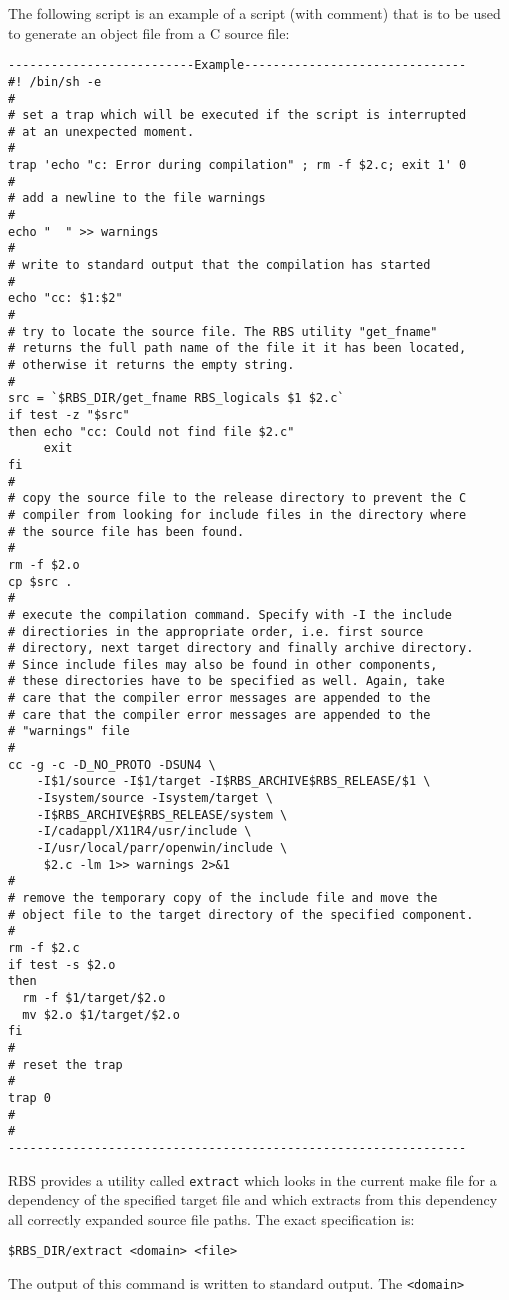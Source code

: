 The following script is an example of a script (with comment) that is to be 
used to generate an object file from a C source file:
\begin{verbatim}
--------------------------Example-------------------------------
#! /bin/sh -e
#
# set a trap which will be executed if the script is interrupted 
# at an unexpected moment.
#
trap 'echo "c: Error during compilation" ; rm -f $2.c; exit 1' 0
#
# add a newline to the file warnings
#
echo "  " >> warnings
#
# write to standard output that the compilation has started
#
echo "cc: $1:$2"
#
# try to locate the source file. The RBS utility "get_fname" 
# returns the full path name of the file it it has been located,
# otherwise it returns the empty string.
#
src = `$RBS_DIR/get_fname RBS_logicals $1 $2.c`
if test -z "$src"
then echo "cc: Could not find file $2.c"
     exit
fi
#
# copy the source file to the release directory to prevent the C
# compiler from looking for include files in the directory where
# the source file has been found.
#
rm -f $2.o
cp $src .
#
# execute the compilation command. Specify with -I the include
# directiories in the appropriate order, i.e. first source 
# directory, next target directory and finally archive directory.
# Since include files may also be found in other components, 
# these directories have to be specified as well. Again, take 
# care that the compiler error messages are appended to the 
# care that the compiler error messages are appended to the 
# "warnings" file
#
cc -g -c -D_NO_PROTO -DSUN4 \
    -I$1/source -I$1/target -I$RBS_ARCHIVE$RBS_RELEASE/$1 \
    -Isystem/source -Isystem/target \
    -I$RBS_ARCHIVE$RBS_RELEASE/system \
    -I/cadappl/X11R4/usr/include \
    -I/usr/local/parr/openwin/include \
     $2.c -lm 1>> warnings 2>&1
#
# remove the temporary copy of the include file and move the
# object file to the target directory of the specified component.
#
rm -f $2.c
if test -s $2.o 
then 
  rm -f $1/target/$2.o
  mv $2.o $1/target/$2.o
fi
#
# reset the trap
#
trap 0
#
#
----------------------------------------------------------------
\end{verbatim}
RBS provides a utility called \verb+extract+ which looks in the current make file for
a dependency of the specified target file and which extracts from this 
dependency all correctly expanded source file paths. The exact specification is:
\begin{verbatim}
$RBS_DIR/extract <domain> <file>
\end{verbatim}
The output of this command is written to standard output. The \verb+<domain>+ 
